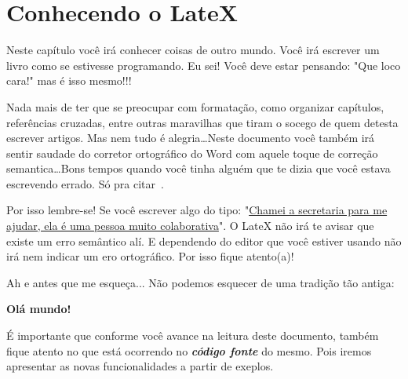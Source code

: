 \chapter{Conhecendo o LateX}\label{capConhecendoLatex}
Neste capítulo você irá conhecer coisas de outro mundo. Você irá escrever um livro como se estivesse programando. Eu sei! Você deve estar pensando: "Que loco cara!" mas é isso mesmo!!!

Nada mais de ter que se preocupar com formatação, como organizar capítulos, referências cruzadas, entre outras maravilhas que tiram o socego de quem detesta escrever artigos. Mas nem tudo é alegria\ldots Neste documento você também irá sentir saudade do corretor ortográfico do Word com aquele toque de correção semantica\ldots Bons tempos quando você tinha alguém que te dizia que você estava escrevendo errado. Só pra citar~\cite{camargo}.

Por isso lembre-se! Se você escrever algo do tipo: "\underline{Chamei a secretaria para me ajudar, ela é uma pessoa muito colaborativa}". O LateX não irá te avisar que existe um erro semântico alí. E dependendo do editor que você estiver usando não irá nem indicar um ero ortográfico. Por isso fique atento(a)!

Ah e antes que me esqueça... Não podemos esquecer de uma tradição tão antiga:

\textbf{Olá mundo!}

É importante que conforme você avance na leitura deste documento, também fique atento no que está ocorrendo no \textbf{\textit{código fonte}} do mesmo. Pois iremos apresentar as novas funcionalidades a partir de exeplos.

